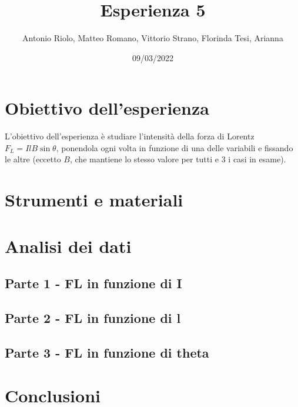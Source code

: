 \documentclass[11pt, a4paper]{article}
\title{Esperienza 5}
\author{Antonio Riolo, Matteo Romano, Vittorio Strano, Florinda Tesi, Arianna } %
\date{09/03/2022} %
\numberwithin{equation}{section} %
\begin{document}
    \section{Obiettivo dell'esperienza}

    L'obiettivo dell'esperienza è studiare l'intensità della forza di Lorentz $F_{L} = IlB \sin \theta$, ponendola ogni volta in funzione di una delle variabili e fissando le altre (eccetto $B$, che mantiene lo stesso valore per tutti e 3 i casi in esame).

    \section{Strumenti e materiali}



    \section{Analisi dei dati}
    
    \subsection{Parte 1 - FL in funzione di I}

    \subsection{Parte 2 - FL in funzione di l} %

    \subsection{Parte 3 - FL in funzione di theta}

    \section{Conclusioni}
\end{document}
